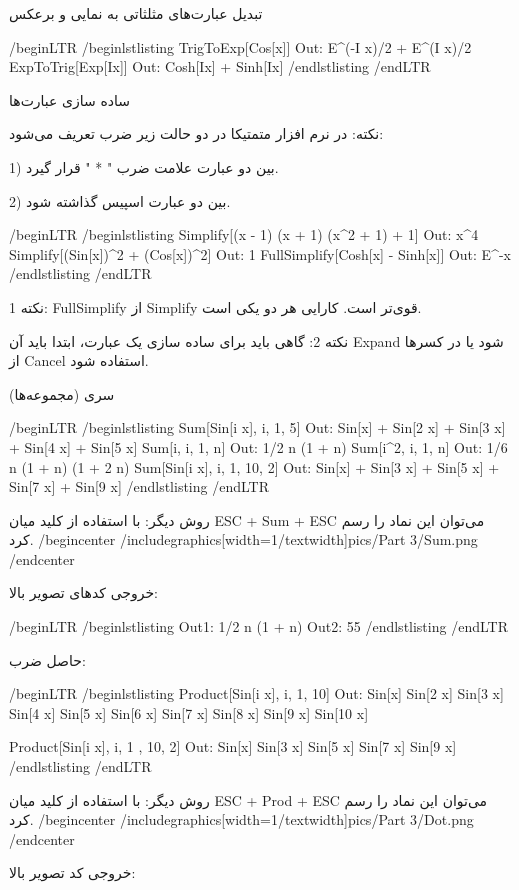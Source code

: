 تبدیل عبارت‌های مثلثاتی به نمایی و برعکس

/begin{LTR}
/begin{lstlisting}
TrigToExp[Cos[x]]             Out: E^(-I x)/2 + E^(I x)/2
ExpToTrig[Exp[Ix]]            Out: Cosh[Ix] + Sinh[Ix]
/end{lstlisting}
/end{LTR}

ساده سازی عبارت‌ها

نکته: در نرم افزار متمتیکا در دو حالت زیر ضرب تعریف می‌شود:

1) بین دو عبارت علامت ضرب " * " قرار گیرد.

2) بین دو عبارت اسپیس گذاشته شود.

/begin{LTR}
/begin{lstlisting}
Simplify[(x - 1) (x + 1) (x^2 + 1) + 1]            Out: x^4
Simplify[(Sin[x])^2 + (Cos[x])^2]               Out: 1
FullSimplify[Cosh[x] - Sinh[x]]               Out: E^-x
/end{lstlisting}
/end{LTR}

نکته 1: FullSimplify از Simplify قوی‌تر است. کارایی هر دو یکی است.

نکته 2: گاهی باید برای ساده سازی یک عبارت، ابتدا باید آن Expand شود یا در کسرها از Cancel استفاده شود.

سری (مجموعه‌ها)

/begin{LTR}
/begin{lstlisting}
Sum[Sin[i x], {i, 1, 5}]     Out: Sin[x] + Sin[2 x] + Sin[3 x] + Sin[4 x] + Sin[5 x]
Sum[i, {i, 1, n}]            Out: 1/2 n (1 + n)
Sum[i^2, {i, 1, n}]          Out: 1/6 n (1 + n) (1 + 2 n)
Sum[Sin[i x], {i, 1, 10, 2}] Out: Sin[x] + Sin[3 x] + Sin[5 x] + Sin[7 x] + Sin[9 x]
/end{lstlisting}
/end{LTR}

روش دیگر: با استفاده از کلید میان ESC + Sum + ESC می‌توان این نماد را رسم کرد.
/begin{center}
/includegraphics[width=1/textwidth]{pics/Part 3/Sum.png}
/end{center}

خروجی کدهای تصویر بالا:

/begin{LTR}
/begin{lstlisting}
Out1: 1/2 n (1 + n)
Out2: 55
/end{lstlisting}
/end{LTR}

حاصل ضرب:

/begin{LTR}
/begin{lstlisting}
Product[Sin[i x], {i, 1, 10}]    Out: Sin[x] Sin[2 x] Sin[3 x] Sin[4 x] Sin[5 x] 
	Sin[6 x] Sin[7 x] Sin[8 x] Sin[9 x] Sin[10 x]

Product[Sin[i x], {i, 1 , 10, 2}] Out: Sin[x] Sin[3 x] Sin[5 x] Sin[7 x] Sin[9 x]
/end{lstlisting}
/end{LTR}

روش دیگر: با استفاده از کلید میان ESC + Prod + ESC می‌توان این نماد را رسم کرد.
/begin{center}
/includegraphics[width=1/textwidth]{pics/Part 3/Dot.png}
/end{center}

خروجی کد تصویر بالا:

